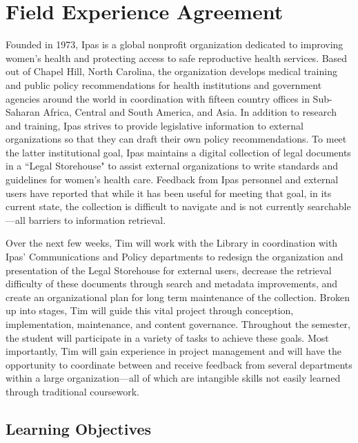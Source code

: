 \documentclass{article}
\begin{document}
\section*{Field Experience Agreement}

Founded in 1973, Ipas is a global nonprofit organization dedicated to improving women's health and protecting access to safe reproductive health services. Based out of Chapel Hill, North Carolina, the organization develops medical training and public policy recommendations for health institutions and government agencies around the world in coordination with fifteen country offices in Sub-Saharan Africa, Central and South America, and Asia. In addition to research and training, Ipas strives to provide legislative information to external organizations so that they can draft their own policy recommendations. To meet the latter institutional goal, Ipas maintains a digital collection of legal documents in a ``Legal Storehouse" to assist external organizations to write standards and guidelines for women's health care. Feedback from Ipas personnel and external users have reported that while it has been useful for meeting that goal, in its current state, the collection is difficult to navigate and is not currently searchable---all barriers to information retrieval.

Over the next few weeks, Tim will work with the Library in coordination with Ipas' Communications and Policy departments to redesign the organization and presentation of the Legal Storehouse for external users, decrease the retrieval difficulty of these documents through search and metadata improvements, and create an organizational plan for long term maintenance of the collection. Broken up into stages, Tim will guide this vital project through conception, implementation, maintenance, and content governance. Throughout the semester, the student will participate in a variety of tasks to achieve these goals. Most importantly, Tim will gain experience in project management and will have the opportunity to coordinate between and receive feedback from several departments within a large organization---all of which are intangible skills not easily learned through traditional coursework.

\subsection*{Learning Objectives}
\end{document}
